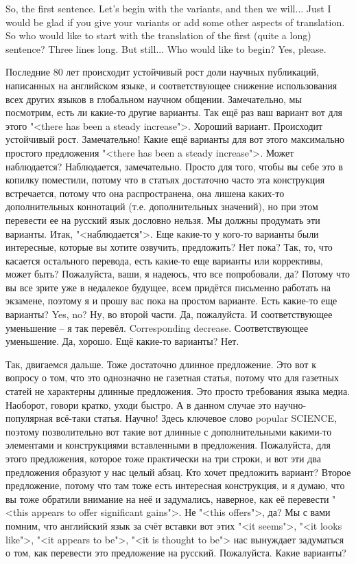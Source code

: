 \documentclass[main.tex]{subfiles}
\begin{document}
So, the first sentence.
Let's begin with the variants, and then we will...
Just I would be glad if you give your variants or add some other aspects of translation.
So who would like to start with the translation of the first (quite a long) sentence?
Three lines long.
But still...
Who would like to begin?
Yes, please.

Последние 80 лет происходит устойчивый рост доли научных публикаций, написанных на английском языке, и соответствующее снижение использования всех других языков в глобальном научном общении.
Замечательно, мы посмотрим, есть ли какие-то другие варианты.
Так ещё раз ваш вариант вот для этого "<there has been a steady increase">.
Хороший вариант.
Происходит устойчивый рост.
Замечательно!
Какие ещё варианты для вот этого максимально простого предложения "<there has been a steady increase">.
Может наблюдается?
Наблюдается, замечательно.
Просто для того, чтобы вы себе это в копилку поместили, потому что в статьях достаточно часто эта конструкция встречается, потому что она распространена, она лишена каких-то дополнительных коннотаций (т.е. дополнительных значений), но при этом перевести ее на русский язык дословно нельзя.
Мы должны продумать эти варианты.
Итак, "<наблюдается">.
Еще какие-то у кого-то варианты были интересные, которые вы хотите озвучить, предложить?
Нет пока?
Так, то, что касается остального перевода, есть какие-то еще варианты или коррективы, может быть?
Пожалуйста, ваши, я надеюсь, что все попробовали, да?
Потому что вы все зрите уже в недалекое будущее, всем придётся письменно работать на экзамене, поэтому я и прошу вас пока на простом варианте.
Есть какие-то еще варианты?
Yes, no?
Ну, во второй части.
Да, пожалуйста.
И соответствующее уменьшение -- я так перевёл.
Corresponding decrease.
Соответствующее уменьшение.
Да, хорошо.
Ещё какие-то варианты?
Нет.

Так, двигаемся дальше.
Тоже достаточно длинное предложение.
Это вот к вопросу о том, что это однозначно не газетная статья, потому что для газетных статей не характерны длинные предложения.
Это просто требования языка медиа.
Наоборот, говори кратко, уходи быстро.
А в данном случае это научно-популярная всё-таки статья.
Научно!
Здесь ключевое слово popular SCIENCE, поэтому позволительно вот такие вот длинные с дополнительными какими-то элементами и конструкциями вставленными в предложения.
Пожалуйста, для этого предложения, которое тоже практически на три строки, и вот эти два предложения образуют у нас целый абзац.
Кто хочет предложить вариант?
Второе предложение, потому что там тоже есть интересная конструкция, и я думаю, что вы тоже обратили внимание на неё и задумались, наверное, как её перевести "<this appears to offer significant gains">.
Не "<this offers">, да?
Мы с вами помним, что английский язык за счёт вставки вот этих "<it seems">, "<it looks like">, "<it appears to be">, "<it is thought to be"> нас вынуждает задуматься о том, как перевести это предложение на русский.
Пожалуйста.
Какие варианты?
\end{document}
